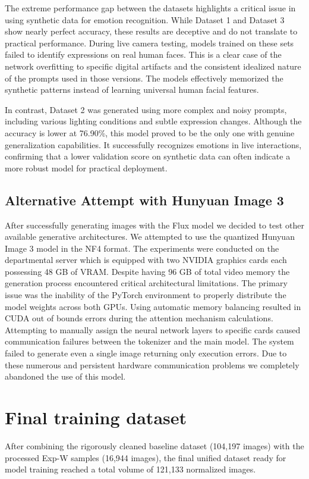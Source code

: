 \documentclass{article}
\begin{document}
The extreme performance gap between the datasets highlights a critical issue in using synthetic data for emotion recognition. While Dataset 1 and Dataset 3 show nearly perfect accuracy, these results are deceptive and do not translate to practical performance. During live camera testing, models trained on these sets failed to identify expressions on real human faces. This is a clear case of the network overfitting to specific digital artifacts and the consistent idealized nature of the prompts used in those versions. The models effectively memorized the synthetic patterns instead of learning universal human facial features.

In contrast, Dataset 2 was generated using more complex and noisy prompts, including various lighting conditions and subtle expression changes. Although the accuracy is lower at 76.90\%, this model proved to be the only one with genuine generalization capabilities. It successfully recognizes emotions in live interactions, confirming that a lower validation score on synthetic data can often indicate a more robust model for practical deployment.

\subsection{Alternative Attempt with Hunyuan Image 3}
After successfully generating images with the Flux model we decided to test other available generative architectures. We attempted to use the quantized Hunyuan Image 3 model in the NF4 format. The experiments were conducted on the departmental server which is equipped with two NVIDIA graphics cards each possessing 48 GB of VRAM. Despite having 96 GB of total video memory the generation process encountered critical architectural limitations. The primary issue was the inability of the PyTorch environment to properly distribute the model weights across both GPUs. Using automatic memory balancing resulted in CUDA out of bounds errors during the attention mechanism calculations. Attempting to manually assign the neural network layers to specific cards caused communication failures between the tokenizer and the main model. The system failed to generate even a single image returning only execution errors. Due to these numerous and persistent hardware communication problems we completely abandoned the use of this model.

\section{Final training dataset}
After combining the rigorously cleaned baseline dataset (104,197 images) with the processed Exp-W samples (16,944 images), the final unified dataset ready for model training reached a total volume of 121,133 normalized images.
\end{document}
